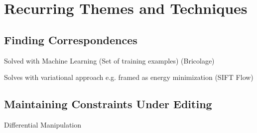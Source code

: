 \chapter{Recurring Themes and Techniques}

\section{Finding Correspondences}

Solved with Machine Learning (Set of training examples) (Bricolage)

Solves with variational approach e.g. framed as energy minimization (SIFT Flow)

\section{Maintaining Constraints Under Editing}

Differential Manipulation